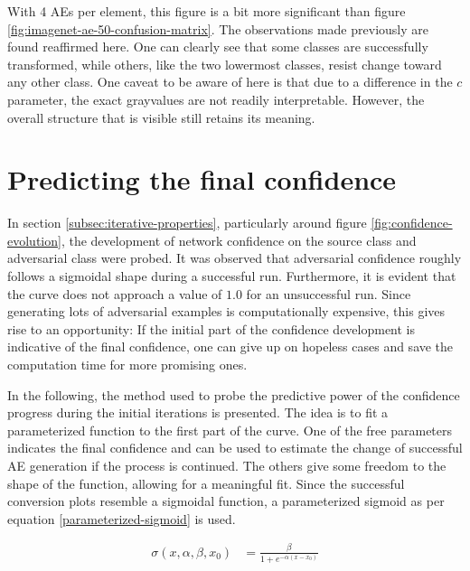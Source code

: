 \documentclass[11pt, a4paper]{article}
\newcommand\braces[1]{\left(#1\right)}
\begin{document}
With 4 AEs per element, this figure is a bit more significant than figure \ref{fig:imagenet-ae-50-confusion-matrix}. The observations made previously are found reaffirmed here. One can clearly see that some classes are successfully transformed, while others, like the two lowermost classes, resist change toward any other class. One caveat to be aware of here is that due to a difference in the $c$ parameter, the exact grayvalues are not readily interpretable. However, the overall structure that is visible still retains its meaning.












\section{Predicting the final confidence}
In section \ref{subsec:iterative-properties}, particularly around figure \ref{fig:confidence-evolution}, the development of network confidence on the source class and adversarial class were probed. It was observed that adversarial confidence roughly follows a sigmoidal shape during a successful run. Furthermore, it is evident that the curve does not approach a value of $1.0$ for an unsuccessful run. Since generating lots of adversarial examples is computationally expensive, this gives rise to an opportunity: If the initial part of the confidence development is indicative of the final confidence, one can give up on hopeless cases and save the computation time for more promising ones.

In the following, the method used to probe the predictive power of the confidence progress during the initial iterations is presented. The idea is to fit a parameterized function to the first part of the curve. One of the free parameters indicates the final confidence and can be used to estimate the change of successful AE generation if the process is continued. The others give some freedom to the shape of the function, allowing for a meaningful fit. Since the successful conversion plots resemble a sigmoidal function, a parameterized sigmoid as per equation \eqref{parameterized-sigmoid} is used.

\begin{align}
	\sigma \braces{x, \alpha, \beta, x_0} &= \frac{\beta}{1 + e^{-\alpha \braces{x - x_0}}} \label{eq:parameterized-sigmoid}
\end{align}
\end{document}

